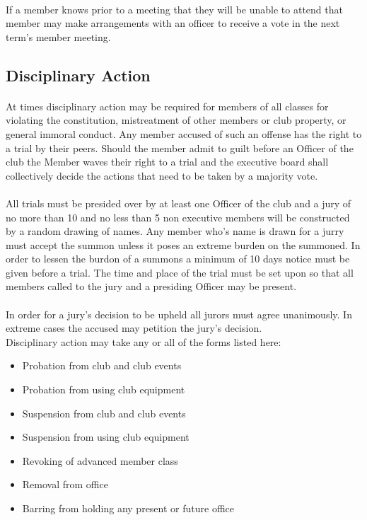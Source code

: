 \documentclass[12pt]{article}
\begin{document}
\paragraph{}
If a member knows prior to a meeting that they will be unable to attend that member may make 
arrangements with an officer to receive a vote in the next term's member meeting.

\subsection{Disciplinary Action}
\paragraph{}
At times disciplinary action may be required for members of all classes for violating the constitution, mistreatment of other members or club property, or general immoral conduct. 
Any member accused of such an offense has the right to a trial by their peers. 
Should the member admit to guilt before an Officer of the club the Member waves their right to a trial and the executive board shall collectively decide the actions that need to be taken by a majority vote.

\paragraph{} 
All trials must be presided over by at least one Officer of the club and a jury of no more than 10 and no less than 5 non executive members will be constructed by a random drawing of names. 
Any member who's name is drawn for a jurry must accept the summon unless it poses an extreme burden on the summoned. In order to lessen the burdon of a summons a minimum of 10 days notice must be given before a trial. The time and place of the trial must be set upon so that all members called to the jury and a presiding Officer may be present. 

\paragraph{}
In order for a jury's decision to be upheld all jurors must agree unanimously. In extreme cases the accused may petition the jury's decision.  
\\
Disciplinary action may take any or all of the forms listed here:
\begin{itemize}
\item Probation from club and club events
\item Probation from using club equipment
\item Suspension from club and club events
\item Suspension from using club equipment
\item Revoking of advanced member class
\item Removal from office
\item Barring from holding any present or future office

\end{itemize}
\end{document}
